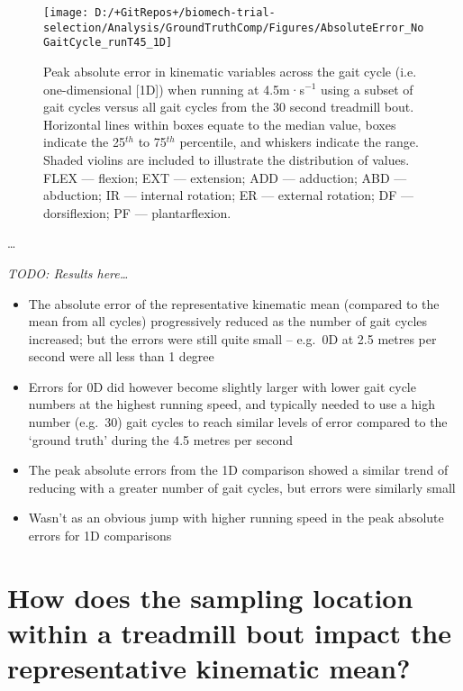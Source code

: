 \documentclass[]{elsarticle} %
\begin{document}
\begin{figure}

{\centering \texttt{[image: D:/+GitRepos+/biomech-trial-selection/Analysis/GroundTruthComp/Figures/AbsoluteError\_NoGaitCycle\_runT45\_1D]} 

}

\caption{Peak absolute error in kinematic variables across the gait cycle (i.e. one-dimensional [1D]) when running at 4.5m·s$^{-1}$ using a subset of gait cycles versus all gait cycles from the 30 second treadmill bout. Horizontal lines within boxes equate to the median value, boxes indicate the 25$^{th}$ to 75$^{th}$ percentile, and whiskers indicate the range. Shaded violins are included to illustrate the distribution of values. FLEX — flexion; EXT — extension; ADD — adduction; ABD — abduction; IR — internal rotation; ER — external rotation; DF — dorsiflexion; PF — plantarflexion.}\label{fig:groundTruthError_runT45_1D}
\end{figure}

\ldots{}

\emph{TODO: Results here\ldots{}}

\begin{itemize}
\item
  The absolute error of the representative kinematic mean (compared to
  the mean from all cycles) progressively reduced as the number of gait
  cycles increased; but the errors were still quite small -- e.g.~0D at
  2.5 metres per second were all less than 1 degree
\item
  Errors for 0D did however become slightly larger with lower gait cycle
  numbers at the highest running speed, and typically needed to use a
  high number (e.g.~30) gait cycles to reach similar levels of error
  compared to the `ground truth' during the 4.5 metres per second
\item
  The peak absolute errors from the 1D comparison showed a similar trend
  of reducing with a greater number of gait cycles, but errors were
  similarly small
\item
  Wasn't as an obvious jump with higher running speed in the peak
  absolute errors for 1D comparisons
\end{itemize}

\hypertarget{how-does-the-sampling-location-within-a-treadmill-bout-impact-the-representative-kinematic-mean}{%
\section{How does the sampling location within a treadmill bout impact
the representative kinematic
mean?}\label{how-does-the-sampling-location-within-a-treadmill-bout-impact-the-representative-kinematic-mean}}
\end{document}
